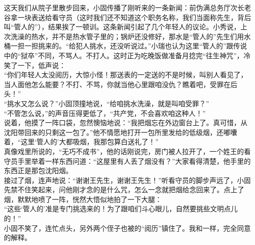 这天我们从院子里散步回来，小固传播了刚听来的一条新闻：前伪满总务厅次长老谷拿一块表送给看守员（这时我们还不知道这个职务名称，我们当面称先生，背后叫“管人的”），结果挨了一顿训。这条新闻引起了几个年轻人的议论。小秀说，上次洗澡的热水，并不是热水管子里的；锅炉还没修好，那水是“管人的”先生们用水桶一担一担挑来的。“给犯人挑水，还没听说过。”小瑞也认为这里“管人的”跟传说中的“狱卒”不同，不骂人。不打人。这时正为吃晚饭做准备月捻完“往生神咒”，冷笑了一下，低声说：\\

“你们年轻人太没阅历，大惊小怪！那送表的一定送的不是时候，叫别人看见了，当人面他怎么能要？不打、不骂，你就当他心里跟咱没仇？瞧着吧，受罪在后头！”\\

“挑水又怎么说？”小固顶撞地说，“给咱挑水洗澡，就是叫咱受罪？”\\

“不管怎么说，”的声音压得更低了，“共产党，不会喜欢咱这种人！”\\

说着，他摸了一阵口袋，忽然懊恼地说：“我把烟忘在外边窗台上了。真可惜，从沈阳带回来的只剩这一包了。”他不情愿地打开一包所里发给的低级烟，还嘟囔着，“这里‘管人的’大都吸烟，我那包算白送礼了！”\\

真像戏里所说的，“无巧不成书”，他的话刚说完，房门被人拉开了，一个姓王的看守员手里举着一样东西问道：“这屋里有人丢了烟没有？”大家看得清楚，他手里的东西正是那包沈阳烟。\\

接过了烟，连声地说：“谢谢王先生，谢谢王先生！”听看守员的脚步声远了，小固先禁不住笑起来，问他刚才念的是什么咒，怎么一念就把烟给念回来了。点上了烟，默默地喷了一阵，恍然大悟似地拍了一下大腿：\\

“这些‘管人的’准是专门挑选来的！为了跟咱们斗心眼儿，自然要挑些文明点儿的！”\\

小固不笑了，连忙点头，另外两个侄子也被的“阅历”镇住了。我和一样，完全同意的解释。\\

